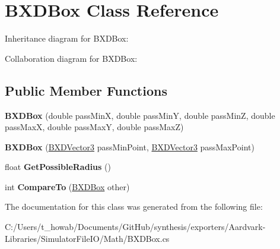 \hypertarget{class_b_x_d_box}{}\section{B\+X\+D\+Box Class Reference}
\label{class_b_x_d_box}


Inheritance diagram for B\+X\+D\+Box\+:


Collaboration diagram for B\+X\+D\+Box\+:
\subsection*{Public Member Functions}
\begin{DoxyCompactItemize}
\item 
\mbox{\label{class_b_x_d_box_ac2bb57b6ca8cd5867dc7c93afa7239e3}} 
{\bfseries B\+X\+D\+Box} (double pass\+MinX, double pass\+MinY, double pass\+MinZ, double pass\+MaxX, double pass\+MaxY, double pass\+MaxZ)
\item 
\mbox{\label{class_b_x_d_box_a6ad011e71e94689163b1860479932e15}} 
{\bfseries B\+X\+D\+Box} (\hyperlink{class_b_x_d_vector3}{B\+X\+D\+Vector3} pass\+Min\+Point, \hyperlink{class_b_x_d_vector3}{B\+X\+D\+Vector3} pass\+Max\+Point)
\item 
\mbox{\label{class_b_x_d_box_afe2b95a6ef509d9062eab69515a5fb6b}} 
float {\bfseries Get\+Possible\+Radius} ()
\item 
\mbox{\label{class_b_x_d_box_aa71e4042d3aca55a61e5ed557c643b9f}} 
int {\bfseries Compare\+To} (\hyperlink{class_b_x_d_box}{B\+X\+D\+Box} other)
\end{DoxyCompactItemize}


The documentation for this class was generated from the following file\+:\begin{DoxyCompactItemize}
\item 
C\+:/\+Users/t\+\_\+howab/\+Documents/\+Git\+Hub/synthesis/exporters/\+Aardvark-\/\+Libraries/\+Simulator\+File\+I\+O/\+Math/B\+X\+D\+Box.\+cs\end{DoxyCompactItemize}
